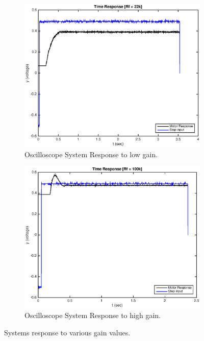 \documentclass[11pt,a4paper]{article}
\begin{document}
\begin{enumerate}
	\begin{figure}[H]
	  \begin{subfigure}{0.5\textwidth}
	  \includegraphics[width=0.95\linewidth]{Matlab_Code/Figures/D3_22k.eps} 
	  \caption{Oscilloscope System Response to low gain.}
	  \label{fig:subim1}
	  \end{subfigure}
	  \begin{subfigure}{0.5\textwidth}
	  \includegraphics[width=0.95\linewidth]{Matlab_Code/Figures/D3_100k.eps}
	  \caption{Oscilloscope System Response to high gain.}
	  \label{fig:subim2}
	  \end{subfigure}
	  \caption{\label{fig:gainimpact}Systems response to various gain values.}
	\end{figure}
	

\end{enumerate}
\end{document}
